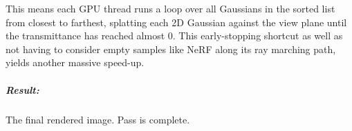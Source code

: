 This means each GPU thread runs a loop over all Gaussians in the sorted list from closest to farthest, splatting each 2D Gaussian against the view plane until the trans\-mit\-tance has reached almost $0$. This early-stopping shortcut as well as not having to consider empty samples like NeRF along its ray marching path, yields another massive speed-up.
\subparagraph{Result:} The final rendered image. Pass is complete.

